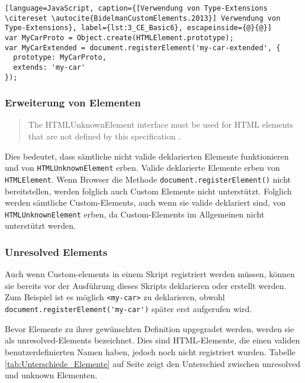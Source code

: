 \begin{lstlisting}[language=JavaScript, caption={[Verwendung von Type-Extensions \citereset \autocite{BidelmanCustomElements.2013}] Verwendung von Type-Extensions}, label={lst:3_CE_Basic6}, escapeinside={@}{@}]
var MyCarProto = Object.create(HTMLElement.prototype);
var MyCarExtended = document.registerElement('my-car-extended', {
  prototype: MyCarProto,
  extends: 'my-car'
});
\end{lstlisting}

\subsubsection{Erweiterung von Elementen}

\begin{quote}
\glqq The HTMLUnknownElement interface must be used for HTML elements that are not defined by this specification \citereset \autocite{BidelmanCustomElements.2013}.\grqq
\end{quote}
Dies bedeutet, dass sämtliche nicht valide deklarierten Elemente funktionieren und von \lstinline|HTMLUnknownElement| erben. Valide deklarierte Elemente erben von \lstinline|HTMLElement|. Wenn Browser die Methode \lstinline|document.registerElement()| nicht bereitstellen, werden folglich auch Custom Elemente nicht unterstützt. Folglich werden sämtliche Custom-Elements, auch wenn sie valide deklariert sind, von \lstinline|HTMLUnknownElement| erben, da Custom-Elements im Allgemeinen nicht unterstützt werden.

\subsubsection{Unresolved Elements}

Auch wenn Custom-elements in einem Skript registriert werden müssen, können sie bereits vor der Ausführung dieses Skripts deklarieren oder erstellt werden. Zum Beispiel ist es möglich \lstinline|<my-car>| zu deklarieren, obwohl \lstinline|document.registerElement('my-car')| später erst aufgerufen wird.

Bevor Elemente zu ihrer gewünschten Definition upgegradet werden, werden sie als \glqq unresolved\grqq -Elements bezeichnet. Dies sind HTML-Elemente, die einen validen benutzerdefinierten Namen haben, jedoch noch nicht registriert wurden. Tabelle \ref{tab:Unterschiede_Elemente} auf Seite \pageref{tab:Unterschiede_Elemente} zeigt den Unterschied zwischen unresolved und unknown Elementen.


